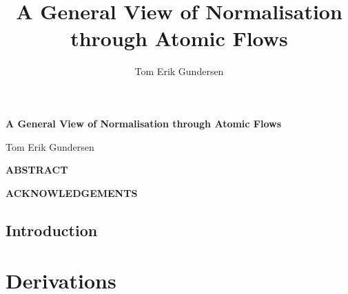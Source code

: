 \documentclass[a4paper,11pt,twoside]{report}
\author{Tom Erik Gundersen}
\title{A General View of Normalisation through Atomic Flows}
\begin{document}

%
%
%
\renewcommand{\thepage}{\roman{page}}
\maketitle

\clearpage
\thispagestyle{plain}
{\begin{center}
\vspace*{\fill}
{\def\baselinestretch{1.2}\Huge\bf A General View of Normalisation through Atomic Flows \par}
\vspace{4cm}
{\begin{center}{\huge Tom Erik Gundersen }\end{center}}
\vspace*{\fill}
\end{center}}

\clearpage
\thispagestyle{plain}
\vspace*{\fill}
\begin{center}
  \Large\bfseries{ABSTRACT}
\end{center}

\vspace*{\fill}

\clearpage
\thispagestyle{plain}
\vspace*{\fill}
\begin{center}
  {\Large\bfseries{ACKNOWLEDGEMENTS}}
\end{center}

\vspace*{\fill}



{
\tableofcontents
}
\newpage
{}
\chapter{Introduction}

\part{Derivations}


\end{document}
